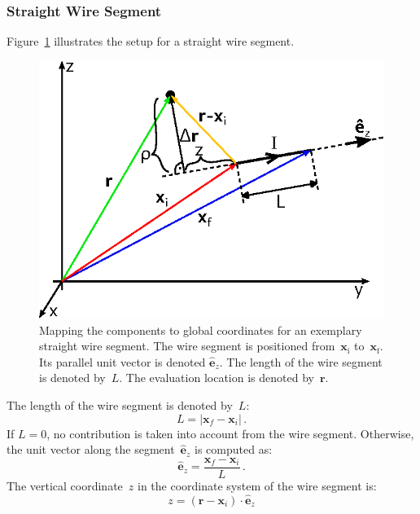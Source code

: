 \subsubsection{Straight Wire Segment}
Figure~\ref{fig:StraightWireSegment_MappingToCartesian} illustrates the setup for a straight wire segment.
\begin{figure}[htbp]
 \centering
 \includegraphics{img/StraightWireSegment_MappingToCartesian.eps}
 \caption{Mapping the components to global coordinates for an exemplary straight wire segment.
          The wire segment is positioned from~$\mathbf{x}_\mathrm{i}$ to~$\mathbf{x}_\mathrm{f}$.
          Its parallel unit vector is denoted $\hat{\mathbf{e}}_z$.
          The length of the wire segment is denoted by~$L$.
          The evaluation location is denoted by~$\mathbf{r}$.}
 \label{fig:StraightWireSegment_MappingToCartesian}
\end{figure}
The length of the wire segment is denoted by~$L$:
\begin{equation}
  L = |\mathbf{x}_f - \mathbf{x}_i| \, .
\end{equation}
If $L=0$, no contribution is taken into account from the wire segment.
Otherwise, the unit vector along the segment~$\hat{\mathbf{e}}_z$ is computed as:
\begin{equation}
  \hat{\mathbf{e}}_z = \frac{\mathbf{x}_f - \mathbf{x}_i}{L} \, .
\end{equation}
The vertical coordinate~$z$ in the coordinate system of the wire segment is:
\begin{equation}
  z = (\mathbf{r} - \mathbf{x}_i) \cdot \hat{\mathbf{e}}_z
\end{equation}
